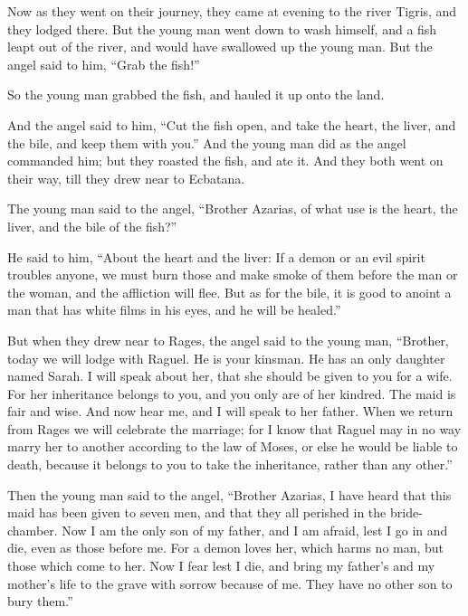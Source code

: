  Now as they went on their journey, they came at evening to
the river Tigris, and they lodged there.  But the young man
went down to wash himself, and a fish leapt out of the river, and would
have swallowed up the young man.  But the angel said to him,
``Grab the fish!''

So the young man grabbed the fish, and hauled it up onto the land.

 And the angel said to him, ``Cut the fish open, and take
the heart, the liver, and the bile, and keep them with you.''
 And the young man did as the angel commanded him; but they
roasted the fish, and ate it. And they both went on their way, till they
drew near to Ecbatana.

 The young man said to the angel, ``Brother Azarias, of what
use is the heart, the liver, and the bile of the fish?''

 He said to him, ``About the heart and the liver: If a demon
or an evil spirit troubles anyone, we must burn those and make smoke of
them before the man or the woman, and the affliction will flee.
 But as for the bile, it is good to anoint a man that has
white films in his eyes, and he will be healed.''

 But when they drew near to Rages,  the angel
said to the young man, ``Brother, today we will lodge with Raguel. He is
your kinsman. He has an only daughter named Sarah. I will speak about
her, that she should be given to you for a wife.  For her
inheritance belongs to you, and you only are of her kindred.
 The maid is fair and wise. And now hear me, and I will
speak to her father. When we return from Rages we will celebrate the
marriage; for I know that Raguel may in no way marry her to another
according to the law of Moses, or else he would be liable to death,
because it belongs to you to take the inheritance, rather than any
other.''

 Then the young man said to the angel, ``Brother Azarias, I
have heard that this maid has been given to seven men, and that they all
perished in the bride-chamber.  Now I am the only son of my
father, and I am afraid, lest I go in and die, even as those before me.
For a demon loves her, which harms no man, but those which come to her.
Now I fear lest I die, and bring my father's and my mother's life to the
grave with sorrow because of me. They have no other son to bury them.''

